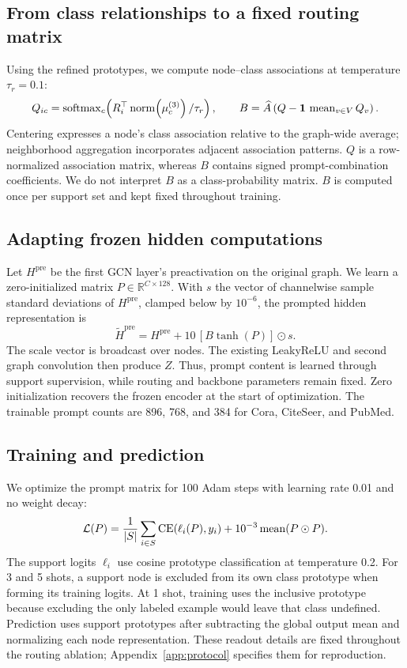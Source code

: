 \subsection{From class relationships to a fixed routing matrix}
Using the refined prototypes, we compute node--class associations at temperature $\tau_r=0.1$:
\begin{equation}
Q_{ic}=\operatorname{softmax}_c\!\left(R_i^\top\operatorname{norm}\!\left(\mu_c^{(3)}\right)/\tau_r\right),\qquad
B=\widehat A\left(Q-\mathbf1\,\operatorname{mean}_{v\in V}Q_v\right).
\label{eq:routing}
\end{equation}
Centering expresses a node's class association relative to the graph-wide average; neighborhood aggregation incorporates adjacent association patterns. $Q$ is a row-normalized association matrix, whereas $B$ contains signed prompt-combination coefficients. We do not interpret $B$ as a class-probability matrix. $B$ is computed once per support set and kept fixed throughout training.

\subsection{Adapting frozen hidden computations}
Let $H^{\mathrm{pre}}$ be the first GCN layer's preactivation on the original graph. We learn a zero-initialized matrix $P\in\mathbb R^{C\times128}$. With $s$ the vector of channelwise sample standard deviations of $H^{\mathrm{pre}}$, clamped below by $10^{-6}$, the prompted hidden representation is
\begin{equation}
\widetilde H^{\mathrm{pre}}=H^{\mathrm{pre}}+10\,[B\tanh(P)]\odot s.
\label{eq:injection}
\end{equation}
The scale vector is broadcast over nodes. The existing LeakyReLU and second graph convolution then produce $Z$. Thus, prompt content is learned through support supervision, while routing and backbone parameters remain fixed. Zero initialization recovers the frozen encoder at the start of optimization. The trainable prompt counts are 896, 768, and 384 for Cora, CiteSeer, and PubMed.

\subsection{Training and prediction}
We optimize the prompt matrix for 100 Adam steps with learning rate 0.01 and no weight decay:
\begin{equation}
\mathcal L(P)=\frac{1}{|S|}\sum_{i\in S}\operatorname{CE}(\ell_i(P),y_i)
+10^{-3}\operatorname{mean}(P\odot P).
\label{eq:loss}
\end{equation}
The support logits $\ell_i$ use cosine prototype classification at temperature 0.2. For 3 and 5 shots, a support node is excluded from its own class prototype when forming its training logits. At 1 shot, training uses the inclusive prototype because excluding the only labeled example would leave that class undefined. Prediction uses support prototypes after subtracting the global output mean and normalizing each node representation. These readout details are fixed throughout the routing ablation; Appendix~\ref{app:protocol} specifies them for reproduction.

